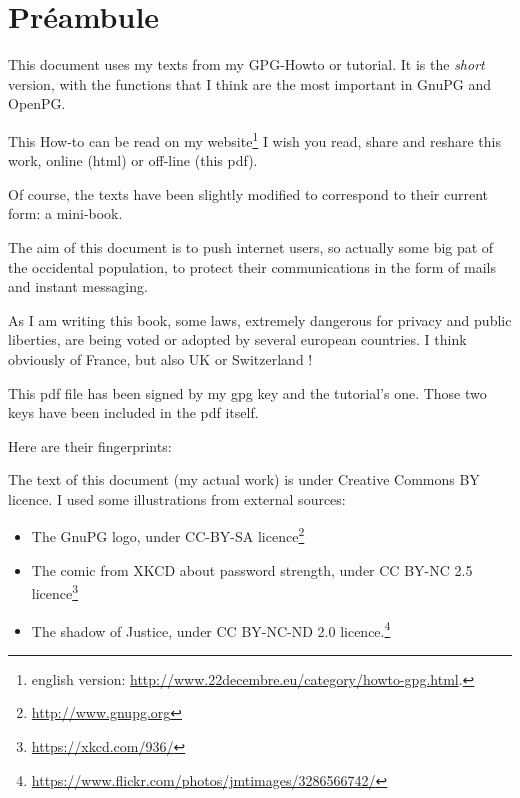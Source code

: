 \documentclass[10pt,a4paper,openany]{book}
\title{\huge\bsc{Des chiffres et des lettres}}
\author{Stéphane \bsc{22Decembre Guedon}}
\date{13 mai 2015}
\begin{document}
	\maketitle

	\chapter{Préambule}
	
	This document uses my texts from my GPG-Howto or tutorial. It is the \textit{short} version, with the functions that I think are the most important in GnuPG and OpenPG.
	
	This How-to can be read on my website\footnote{english version: \url{http://www.22decembre.eu/category/howto-gpg.html}.} I wish you read, share and reshare this work, online (html) or off-line (this pdf).
	
	Of course, the texts have been slightly modified to correspond to their current form: a mini-book.
	
	The aim of this document is to push internet users, so actually some big pat of the occidental population, to protect their communications in the form of mails and instant messaging.
	
	As I am writing this book, some laws, extremely dangerous for privacy and public liberties, are being voted or adopted by several european countries. I think obviously of France, but also UK or Switzerland !
	
	This pdf file has been signed by my gpg key and the tutorial's one. Those two keys have been included in the pdf itself.
	
	Here are their fingerprints:
	
	\begin{center}
	\end{center}
	\begin{center}
	\end{center}
	
	The text of this document (my actual work) is under Creative Commons BY licence. I used some illustrations from external sources:
	\begin{itemize}
		\item The GnuPG logo, under CC-BY-SA licence\footnote{\url{http://www.gnupg.org}}
		\item The comic from XKCD about password strength, under CC BY-NC 2.5 licence\footnote{\url{https://xkcd.com/936/}}
		\item The shadow of Justice, under CC BY-NC-ND 2.0 licence.\footnote{\url{https://www.flickr.com/photos/jmtimages/3286566742/}}
	\end{itemize}
	
\end{document}
